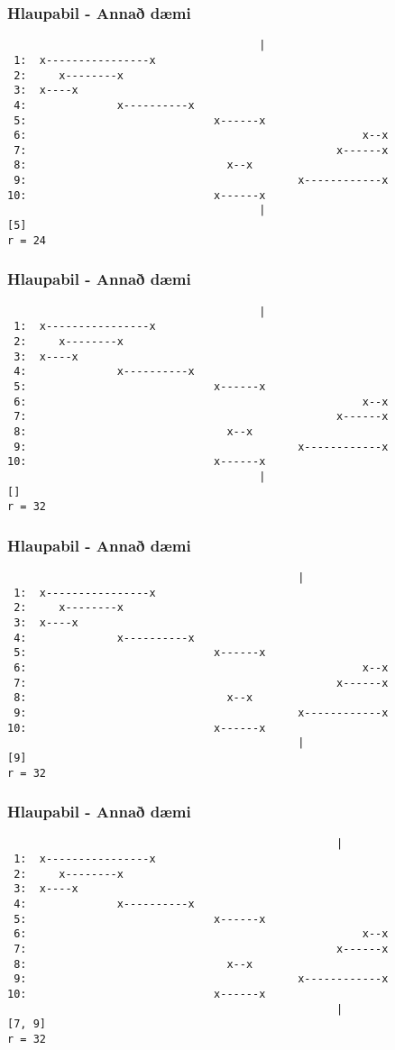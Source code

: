 \documentclass{beamer}
\begin{document}
\begin{frame}[fragile]
	\frametitle{Hlaupabil - Annað dæmi}
\begin{verbatim}
                                       |
 1:  x----------------x
 2:     x--------x
 3:  x----x
 4:              x----------x
 5:                             x------x
 6:                                                    x--x
 7:                                                x------x
 8:                               x--x
 9:                                          x------------x
10:                             x------x
                                       |
[5]
r = 24
\end{verbatim}
\end{frame}
\addtocounter{framenumber}{-1}

\begin{frame}[fragile]
	\frametitle{Hlaupabil - Annað dæmi}
\begin{verbatim}
                                       |
 1:  x----------------x
 2:     x--------x
 3:  x----x
 4:              x----------x
 5:                             x------x
 6:                                                    x--x
 7:                                                x------x
 8:                               x--x
 9:                                          x------------x
10:                             x------x
                                       |
[]
r = 32
\end{verbatim}
\end{frame}
\addtocounter{framenumber}{-1}

\begin{frame}[fragile]
	\frametitle{Hlaupabil - Annað dæmi}
\begin{verbatim}
                                             |
 1:  x----------------x
 2:     x--------x
 3:  x----x
 4:              x----------x
 5:                             x------x
 6:                                                    x--x
 7:                                                x------x
 8:                               x--x
 9:                                          x------------x
10:                             x------x
                                             |
[9]
r = 32
\end{verbatim}
\end{frame}
\addtocounter{framenumber}{-1}

\begin{frame}[fragile]
	\frametitle{Hlaupabil - Annað dæmi}
\begin{verbatim}
                                                   |
 1:  x----------------x
 2:     x--------x
 3:  x----x
 4:              x----------x
 5:                             x------x
 6:                                                    x--x
 7:                                                x------x
 8:                               x--x
 9:                                          x------------x
10:                             x------x
                                                   |
[7, 9]
r = 32
\end{verbatim}
\end{frame}
\addtocounter{framenumber}{-1}
\end{document}
